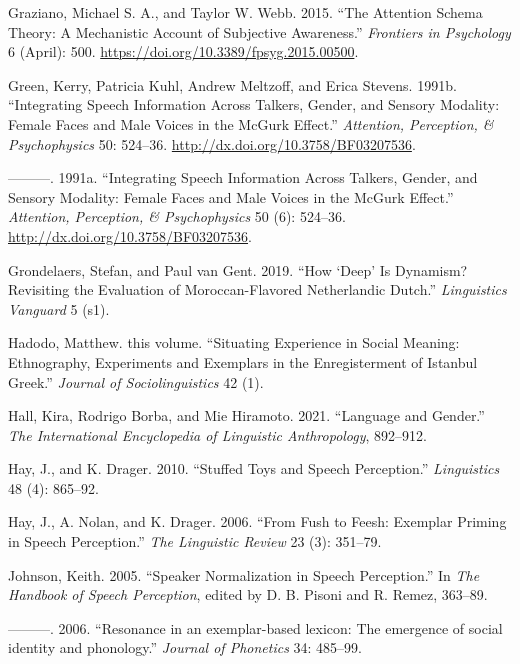 \documentclass[
  letterpaper,
  DIV=11,
  numbers=noendperiod]{scrartcl}
\newlength{\cslhangindent}
\newenvironment{CSLReferences}[2] %
 {\begin{list}{}{%
  \setlength{\itemindent}{0pt}
  \setlength{\leftmargin}{0pt}
  \setlength{\parsep}{0pt}
  \ifodd #1
   \setlength{\leftmargin}{\cslhangindent}
   \setlength{\itemindent}{-1\cslhangindent}
  \fi
  \setlength{\itemsep}{#2\baselineskip}}}
 {\end{list}}
\begin{document}
\begin{CSLReferences}{1}{0}
Graziano, Michael S. A., and Taylor W. Webb. 2015. {``The Attention
Schema Theory: A Mechanistic Account of Subjective Awareness.''}
\emph{Frontiers in Psychology} 6 (April): 500.
\url{https://doi.org/10.3389/fpsyg.2015.00500}.

Green, Kerry, Patricia Kuhl, Andrew Meltzoff, and Erica Stevens. 1991b.
{``Integrating Speech Information Across Talkers, Gender, and Sensory
Modality: Female Faces and Male Voices in the McGurk Effect.''}
\emph{Attention, Perception, \& Psychophysics} 50: 524--36.
\url{http://dx.doi.org/10.3758/BF03207536}.

---------. 1991a. {``Integrating Speech Information Across Talkers,
Gender, and Sensory Modality: {Female} Faces and Male Voices in the
{McGurk} Effect.''} \emph{Attention, Perception, \& Psychophysics} 50
(6): 524--36. \url{http://dx.doi.org/10.3758/BF03207536}.

Grondelaers, Stefan, and Paul van Gent. 2019. {``How {`Deep'} Is
Dynamism? Revisiting the Evaluation of Moroccan-Flavored Netherlandic
Dutch.''} \emph{Linguistics Vanguard} 5 (s1).

Hadodo, Matthew. this volume. {``Situating Experience in Social Meaning:
Ethnography, Experiments and Exemplars in the Enregisterment of Istanbul
Greek.''} \emph{Journal of Sociolinguistics} 42 (1).

Hall, Kira, Rodrigo Borba, and Mie Hiramoto. 2021. {``Language and
Gender.''} \emph{The International Encyclopedia of Linguistic
Anthropology}, 892--912.

Hay, J., and K. Drager. 2010. {``Stuffed Toys and Speech Perception.''}
\emph{Linguistics} 48 (4): 865--92.

Hay, J., A. Nolan, and K. Drager. 2006. {``From Fush to Feesh: Exemplar
Priming in Speech Perception.''} \emph{The Linguistic Review} 23 (3):
351--79.

Johnson, Keith. 2005. {``Speaker Normalization in Speech Perception.''}
In \emph{The Handbook of Speech Perception}, edited by D. B. Pisoni and
R. Remez, 363--89.

---------. 2006. {``{Resonance in an exemplar-based lexicon: The
emergence of social identity and phonology.}''} \emph{Journal of
Phonetics} 34: 485--99.


\end{CSLReferences}
\end{document}
